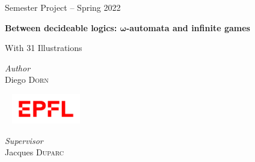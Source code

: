 \begin{titlepage}
\begin{center}
    \Large
    \textsf{Semester Project -- Spring 2022}

    \vspace{1em}

    \textbf{\textsf{
        \Huge
        Between decideable logics: $\boldsymbol\omega$-automata and infinite games
    }}

    \begin{center}
        With 31 Illustrations
    \end{center}


    \vfill

    \begin{center}
        \normalsize
        \scalebox{0.8}{
        
        }
    \end{center}

    \vfill


    \begin{minipage}{0.3\textwidth}
        \textit{Author} \\
        Diego \textsc{Dorn}
    \end{minipage}
    ~
    \includegraphics[width=3cm]{epfl.png}
    ~
    \begin{minipage}{0.3\textwidth}
        \begin{flushright}
            \textit{Supervisor} \\
            Jacques \textsc{Duparc}
        \end{flushright}
    \end{minipage}
    \vspace{1cm}

    \vspace*{-3cm}
\end{center}
\end{titlepage}